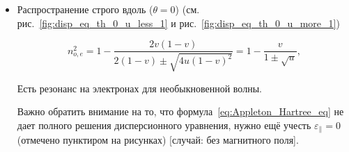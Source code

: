 \documentclass[10pt, a4paper]{article}
\begin{document}
\begin{itemize}
	\item Распространение строго вдоль ($\theta = 0$) (см. рис.~\ref{fig:disp_eq_th_0_u_less_1} и рис.~\ref{fig:disp_eq_th_0_u_more_1})
	
	\begin{equation*}
		n_{o,e}^2=1-\frac{2v(1-v)}{2(1-v) \pm \sqrt{4u(1-v)^2}} = 1-\frac{v}{1\pm\sqrt{u}}, 
	\end{equation*}

	Есть резонанс на электронах для необыкновенной волны.

	Важно обратить внимание на то, что формула~\eqref{eq:Appleton_Hartree_eq} не дает полного решения дисперсионного уравнения, нужно ещё учесть $\varepsilon_{\parallel}=0$ (отмечено пунктиром на рисунках) [случай: без магнитного поля].


\end{itemize}
\end{document}
